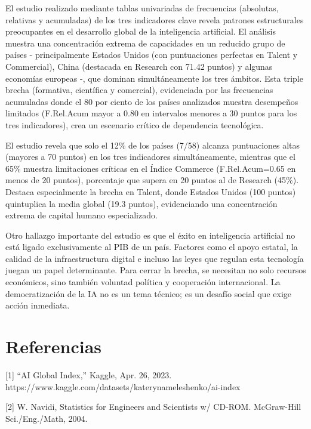 \documentclass[
]{article}
\begin{document}
\begin{multicols}{2}
El estudio realizado mediante tablas univariadas de frecuencias (absolutas, relativas y acumuladas) de los tres indicadores clave revela patrones estructurales preocupantes en el desarrollo global de la inteligencia artificial. El análisis muestra una concentración extrema de capacidades en un reducido grupo de países - principalmente Estados Unidos (con puntuaciones perfectas en Talent y Commercial), China (destacada en Research con 71.42 puntos) y algunas economías europeas -, que dominan simultáneamente los tres ámbitos. Esta triple brecha (formativa, científica y comercial), evidenciada por las frecuencias acumuladas donde el 80 por ciento de los países analizados muestra desempeños limitados (F.Rel.Acum mayor a 0.80 en intervalos menores a 30 puntos para los tres indicadores), crea un escenario crítico de dependencia tecnológica.

El estudio revela que solo el 12\% de los países (7/58) alcanza puntuaciones altas (mayores a 70 puntos) en los tres indicadores simultáneamente, mientras que el 65\% muestra limitaciones críticas en el Índice Commerce (F.Rel.Acum=0.65 en menos de 20 puntos), porcentaje que supera en 20 puntos al de Research (45\%). Destaca especialmente la brecha en Talent, donde Estados Unidos (100 puntos) quintuplica la media global (19.3 puntos), evidenciando una concentración extrema de capital humano especializado.

Otro hallazgo importante del estudio es que el éxito en inteligencia artificial no está ligado exclusivamente al PIB de un país. Factores como el apoyo estatal, la calidad de la infraestructura digital e incluso las leyes que regulan esta tecnología juegan un papel determinante. Para cerrar la brecha, se necesitan no solo recursos económicos, sino también voluntad política y cooperación internacional. La democratización de la IA no es un tema técnico; es un desafío social que exige acción inmediata.

\section{Referencias}
[1]   “AI Global Index,” Kaggle, Apr. 26, 2023.         https://www.kaggle.com/datasets/katerynameleshenko/ai-index

[2]   W. Navidi, Statistics for Engineers and Scientists w/ CD-ROM. McGraw-Hill Sci./Eng./Math, 2004.

\end{multicols}
\end{document}
